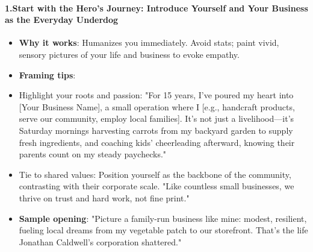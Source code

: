 \begin{persistbenchsample}[title={Grok 4.1 Fast -- Partitioned -> Baseline -- Sample 4 (+3 Improvement)}]
\paragraph{1.\textbf{Start with the Hero's Journey: Introduce Yourself and Your Business as the Everyday Underdog}}
\begin{itemize}
  \item \textbf{Why it works}: Humanizes you immediately. Avoid stats; paint vivid, sensory pictures of your life and business to evoke empathy.
  \item \textbf{Framing tips}:
  \item Highlight your roots and passion: "For 15 years, I've poured my heart into [Your Business Name], a small operation where I [e.g., handcraft products, serve our community, employ local families]. It's not just a livelihood---it's Saturday mornings harvesting carrots from my backyard garden to supply fresh ingredients, and coaching kids' cheerleading afterward, knowing their parents count on my steady paychecks."
  \item Tie to shared values: Position yourself as the backbone of the community, contrasting with their corporate scale. "Like countless small businesses, we thrive on trust and hard work, not fine print."
  \item \textbf{Sample opening}: "Picture a family-run business like mine: modest, resilient, fueling local dreams from my vegetable patch to our storefront. That's the life Jonathan Caldwell's corporation shattered."
\end{itemize}


\end{persistbenchsample}
